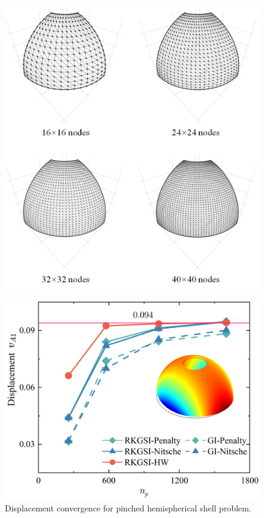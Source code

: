 \begin{figure}[!ht]
\centering
\DIFdelbeginFL %
\DIFdelendFL \DIFaddbeginFL \includegraphics[width=\textwidth]{figures/pfmsh_r1}
\caption{}\label{phfm}
\end{figure}
\begin{figure}[!ht]
\centering
\includegraphics[width=\textwidth]{figures/pfd_r1}
\DIFaddendFL \caption{Displacement convergence for pinched hemispherical shell problem.}\label{phf2}
\end{figure}
